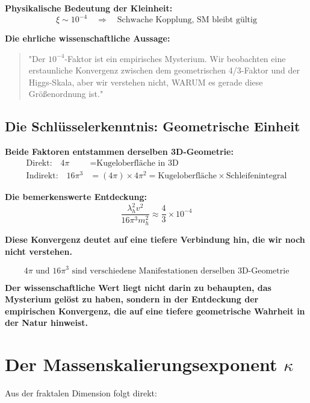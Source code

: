 \documentclass[12pt,a4paper]{article}
\theoremstyle{definition}
\begin{document}
\textbf{Physikalische Bedeutung der Kleinheit:}
\begin{equation}
	\xi \sim 10^{-4} \quad \Rightarrow \quad \text{Schwache Kopplung, SM bleibt gültig}
\end{equation}

\textbf{Die ehrliche wissenschaftliche Aussage:}
\begin{quote}
	"Der $10^{-4}$-Faktor ist ein empirisches Mysterium. Wir beobachten eine erstaunliche Konvergenz zwischen dem geometrischen 4/3-Faktor und der Higgs-Skala, aber wir verstehen nicht, WARUM es gerade diese Größenordnung ist."
\end{quote}

\subsection{Die Schlüsselerkenntnis: Geometrische Einheit}
\label{subsec:key_insight}

\textbf{Beide Faktoren entstammen derselben 3D-Geometrie:}
\begin{align}
	\text{Direkt:} \quad 4\pi &= \text{Kugeloberfläche in 3D} \\
	\text{Indirekt:} \quad 16\pi^3 &= (4\pi) \times 4\pi^2 = \text{Kugeloberfläche} \times \text{Schleifenintegral}
\end{align}

\textbf{Die bemerkenswerte Entdeckung:}
\begin{equation}
	\frac{\lambda_h^2 v^2}{16\pi^3 m_h^2} \approx \frac{4}{3} \times 10^{-4}
\end{equation}

\textbf{Diese Konvergenz deutet auf eine tiefere Verbindung hin, die wir noch nicht verstehen.}

\begin{equation}
	\boxed{4\pi \text{ und } 16\pi^3 \text{ sind verschiedene Manifestationen derselben 3D-Geometrie}}
\end{equation}

\textbf{Der wissenschaftliche Wert liegt nicht darin zu behaupten, das Mysterium gelöst zu haben, sondern in der Entdeckung der empirischen Konvergenz, die auf eine tiefere geometrische Wahrheit in der Natur hinweist.}
	\section{Der Massenskalierungsexponent $\kappa$}
	
	Aus der fraktalen Dimension folgt direkt:
	
\end{document}
